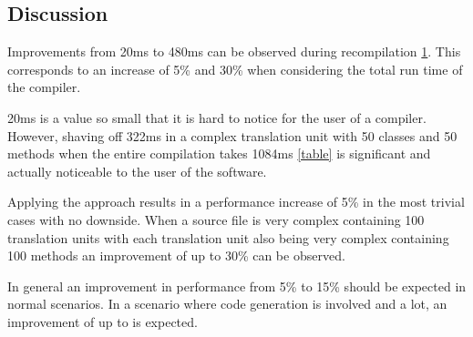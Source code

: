 \documentclass{VUMIFPSbakalaurinis}
\begin{document}
\subsection{Discussion}

Improvements from 20ms to 480ms can be observed during recompilation \ref{graph:speed}.
This corresponds to an increase of 5\% and 30\% when considering the total run time of the compiler.

20ms is a value so small that it is hard to notice for the user of a compiler.
However, shaving off 322ms in a complex translation unit with 50 classes and 50 methods when the entire compilation takes 1084ms \ref{table} is significant and actually noticeable to the user of the software.

Applying the approach results in a performance increase of 5\% in the most trivial cases with no downside.
When a source file is very complex containing 100 translation units with each translation unit also being very complex containing 100 methods an improvement of up to 30\% can be observed.

In general an improvement in performance from 5\% to 15\% should be expected in normal scenarios.
In a scenario where code generation is involved and a lot, an improvement of up to is expected.


\begin{figure}
\label{graph:speed}
\end{figure}

\begin{figure}
\end{figure}
\end{document}
